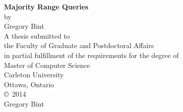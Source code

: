 \documentclass[12pt,letterpaper]{report}
\theoremstyle{definition}
\begin{document}
\begin{titlepage}
   \begin{center}
      \vspace*{\fill}
      \large
      {\bf \LARGE Majority Range Queries}\\
      \vspace{0.25in}
      by\\
      \vspace{0.25in}
      Gregory Bint\\
      \vspace{0.5in}
      A thesis submitted to\\
      the Faculty of Graduate and Postdoctoral Affairs\\
      in partial fulfillment of the requirements for the degree of\\
      \vspace{0.5in}
      Master of Computer Science\\
      \vspace{1.2in}
      Carleton University\\
      Ottawa, Ontario\\
      \vspace{0.5in}
      \copyright\ 2014\\
      Gregory Bint
      \vspace*{\fill}
   \end{center}
\end{titlepage}
\doublespacing
{}
\setcounter{page}{2}


\tableofcontents
\listoffigures
\newpage
\pagestyle{fancy}
\setcounter{page}{1}







\cleardoublepage
{}


\end{document}
